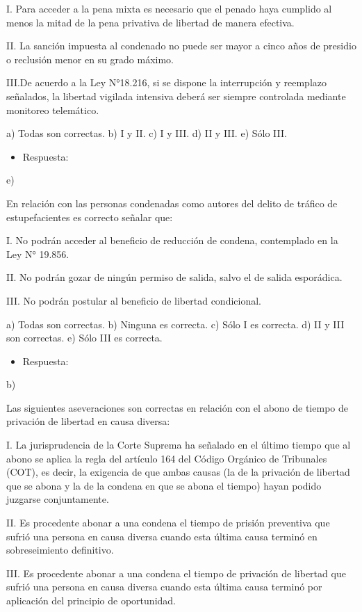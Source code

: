 \documentclass[letterpaper, 11pt]{article}
\begin{document}
I. Para acceder a la pena mixta es necesario que el penado haya cumplido al menos
la mitad de la pena privativa de libertad de manera efectiva.

II. La sanción impuesta al condenado no puede ser mayor a cinco años de presidio o
reclusión menor en su grado máximo.

III.De acuerdo a la Ley N°18.216, si se dispone la interrupción y reemplazo señalados,
la libertad vigilada intensiva deberá ser siempre controlada mediante monitoreo
telemático.	  

a) Todas son correctas.
b) I y II.
c) I y III.
d) II y III.
e) Sólo III.

\begin{itemize}
\item Respuesta:
\end{itemize}
e)

En relación con las personas condenadas como autores del delito de tráfico de
estupefacientes es correcto señalar que:

I. No podrán acceder al beneficio de reducción de condena, contemplado en la Ley
N° 19.856.

II. No podrán gozar de ningún permiso de salida, salvo el de salida esporádica.

III. No podrán postular al beneficio de libertad condicional.

a) Todas son correctas.
b) Ninguna es correcta.
c) Sólo I es correcta.
d) II y III son correctas.
e) Sólo III es correcta.

\begin{itemize}
\item Respuesta:
\end{itemize}
b)

Las siguientes aseveraciones son correctas en relación con el abono de tiempo de
privación de libertad en causa diversa:

I. La jurisprudencia de la Corte Suprema ha señalado en el último tiempo que al
abono se aplica la regla del artículo 164 del Código Orgánico de Tribunales (COT),
es decir, la exigencia de que ambas causas (la de la privación de libertad que se
abona y la de la condena en que se abona el tiempo) hayan podido juzgarse
conjuntamente.

II. Es procedente abonar a una condena el tiempo de prisión preventiva que sufrió
una persona en causa diversa cuando esta última causa terminó en sobreseimiento
definitivo.

III. Es procedente abonar a una condena el tiempo de privación de libertad que sufrió
una persona en causa diversa cuando esta última causa terminó por aplicación del
principio de oportunidad.
\end{document}
